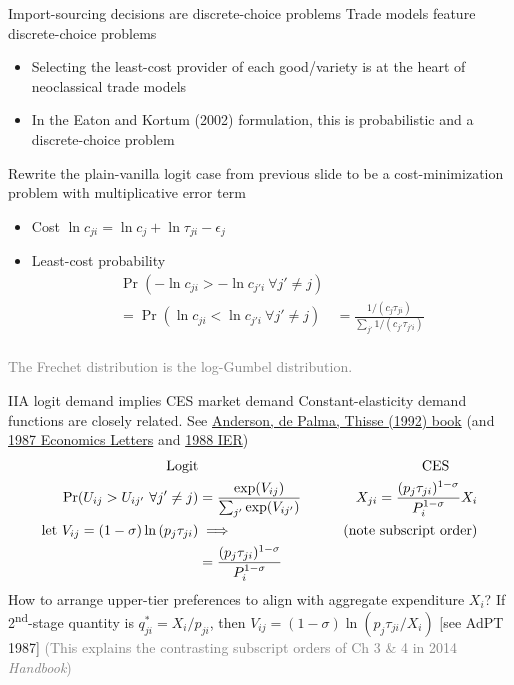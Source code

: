 \documentclass[11pt,notes=hide,aspectratio=169]{beamer}
\begin{document}
\begin{frame}{Import-sourcing decisions are discrete-choice problems}
Trade models feature discrete-choice problems
\begin{itemize}
\item Selecting the least-cost provider of each good/variety is at the heart of neoclassical trade models
\item In the Eaton and Kortum (2002) formulation, this is probabilistic and a discrete-choice problem
\end{itemize}
\smallskip
Rewrite the plain-vanilla logit case from previous slide
to be a cost-minimization problem with multiplicative error term
\begin{itemize}
	\item Cost $\ln c_{ji} = \ln c_j + \ln \tau_{ji} - \epsilon_{j}$
	\item Least-cost probability
	\begin{align*}
	\Pr(-\ln c_{ji}> -\ln c_{j'i} \ \forall j' \neq j) \\
	= \Pr(\ln c_{ji}<\ln c_{j'i} \ \forall j' \neq j) 
	& 
	= \frac{1/(c_j\tau_{ji})}{\sum_{j'}1/(c_{j'}\tau_{j'i})} \\
	\end{align*}
\end{itemize}
\textcolor{gray}{The Frechet distribution is the log-Gumbel distribution.}
\end{frame}
\begin{frame}{IIA logit demand implies CES market demand}
Constant-elasticity demand functions are closely related.
See \href{https://mitpress.mit.edu/9780262011280/discrete-choice-theory-of-product-differentiation/}{Anderson, de Palma, Thisse (1992) book}
(and \href{https://doi.org/10.1016/0165-1765(87)90239-4}{1987 Economics Letters}
and \href{https://doi.org/10.2307/2526791}{1988 IER})
\begin{align*}
\text{Logit} & & \text{CES} \hfill \qquad
\\
\Pr(U_{ij}>U_{ij'} \ \forall j' \neq j) 
&=
\frac{\exp(V_{ij})}{\sum_{j'}\exp(V_{ij'})}
\qquad
&
X_{ji}
=
\frac{(p_j\tau_{ji} )^{1-\sigma}}{P_i^{1-\sigma}} X_i
\\
\text{let } V_{ij} = (1-\sigma) \ln \left(p_j\tau_{ji}\right)
& \implies
&
\textcolor{gray}{\text{(note subscript order)}}
\\
&=
\frac{(p_j\tau_{ji})^{1-\sigma}}{P_i^{1-\sigma}}
\end{align*}
How to arrange upper-tier preferences to align with aggregate expenditure $X_i$?
If 2\textsuperscript{nd}-stage quantity is $q_{ji}^{*} = X_i / p_{ji}$,
then $V_{ij} = (1-\sigma) \ln \left(p_j\tau_{ji}/X_i\right)$
[see AdPT 1987]
\smallskip
\textcolor{gray}{(This explains the contrasting subscript orders of Ch 3 \& 4 in 2014 \textit{Handbook})}
\end{frame}
\end{document}
